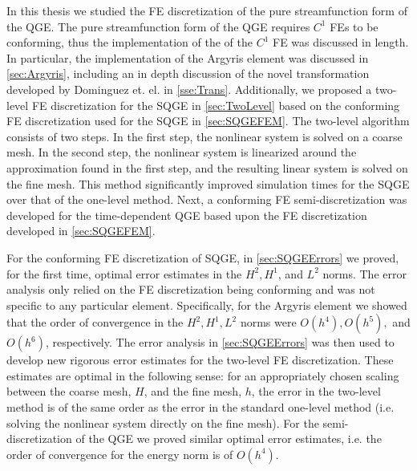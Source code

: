 In this thesis we studied the FE discretization of the pure streamfunction form
of the QGE. The pure streamfunction form of the QGE requires $C^1$ FEs to be
conforming, thus the implementation of the of the $C^1$ FE was discussed in
length. In particular, the implementation of the Argyris element was discussed
in \autoref{sec:Argyris}, including an in depth discussion of the novel
transformation developed by Dominguez et. el.  \cite{Dominguez08} in
\autoref{sse:Trans}. Additionally, we proposed a two-level FE discretization for
the SQGE in \autoref{sec:TwoLevel} based on the conforming FE discretization
used for the SQGE in \autoref{sec:SQGEFEM}. The two-level algorithm consists of
two steps. In the first step, the nonlinear system is solved on a coarse mesh.
In the second step, the nonlinear system is linearized around the approximation
found in the first step, and the resulting linear system is solved on the fine
mesh.  This method significantly improved simulation times for the SQGE over
that of the one-level method. Next, a conforming FE semi-discretization was
developed for the time-dependent QGE based upon the FE discretization developed
in \autoref{sec:SQGEFEM}.

For the conforming FE discretization of SQGE, in \autoref{sec:SQGEErrors} we
proved, for the first time, optimal error estimates in the $H^2,H^1$, and $L^2$
norms. The error analysis only relied on the FE discretization being conforming
and was not specific to any particular element. Specifically, for the Argyris
element we showed that the order of convergence in the $H^2,H^1,L^2$ norms were
$O(h^4),O(h^5),$ and $O(h^6)$, respectively. The error analysis in
\autoref{sec:SQGEErrors} was then used to develop new rigorous error estimates
for the two-level FE discretization. These estimates are optimal in the
following sense: for an appropriately chosen scaling between the coarse mesh,
$H$, and the fine mesh, $h$, the error in the two-level method is of the same
order as the error in the standard one-level method (i.e. solving the nonlinear
system directly on the fine mesh). For the semi-discretization of the QGE we
proved similar optimal error estimates, i.e. the order of convergence for the
energy norm is of $O(h^4)$.

